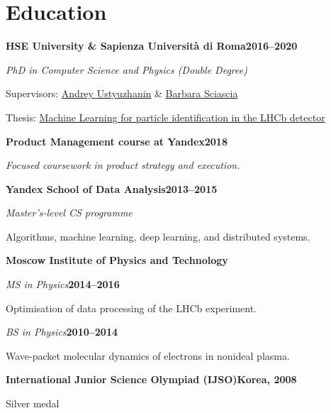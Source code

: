 \documentclass[11pt,a4paper]{article}
\newlength{\projindent}\setlength{\projindent}{1.3em}
\begin{document}
\newpage

\section{Education}
\textbf{HSE University \& Sapienza Università di Roma}\hfill\textbf{2016--2020}\par
\textit{PhD in Computer Science and Physics (Double Degree)}\par
{\leftskip\projindent Supervisors: \href{https://www.linkedin.com/in/andreyustyuzhanin/}{Andrey Ustyuzhanin} \& \href{https://it.linkedin.com/in/barbara-sciascia-234935a}{Barbara Sciascia}\par}
{\leftskip\projindent Thesis: \href{https://repository.cern/records/034yx-nt191}{Machine Learning for particle identification in the LHCb detector}\par}
\smallskip

\textbf{Product Management course at Yandex}\hfill\textbf{2018}\par
\textit{Focused coursework in product strategy and execution.}\par
\smallskip

\textbf{Yandex School of Data Analysis}\hfill\textbf{2013--2015}\par
\textit{Master's-level CS programme}\par
{\leftskip\projindent Algorithms, machine learning, deep learning, and distributed systems.\par}
\smallskip

\textbf{Moscow Institute of Physics and Technology}\par
\textit{MS in Physics}\hfill\textbf{2014--2016}\par
{\leftskip\projindent Optimisation of data processing of the LHCb experiment.\par}
\textit{BS in Physics}\hfill\textbf{2010--2014}\par
{\leftskip\projindent Wave-packet molecular dynamics of electrons in nonideal plasma.\par}
\smallskip

\textbf{International Junior Science Olympiad (IJSO)}\hfill\textbf{Korea, 2008}\par
{\leftskip\projindent Silver medal\par}
\smallskip
\end{document}
